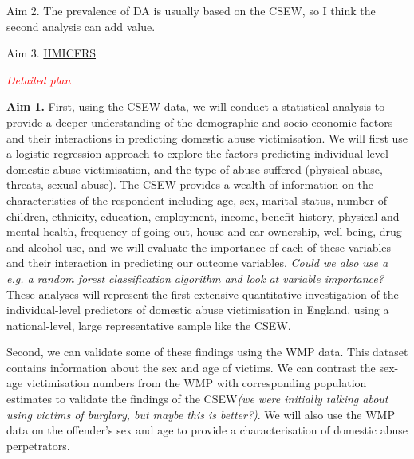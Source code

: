 \documentclass[11pt, a4paper]{article}
\begin{document}
Aim 2. The prevalence of DA is usually based on the CSEW, so I think the second analysis can add value.

Aim 3. \href{https://www.justiceinspectorates.gov.uk/hmicfrs/news/news-feed/little-evidence-of-improvements-in-crime-recording-at-west-midlands-police/}{HMICFRS}

\textcolor{red}{\textit{Detailed plan}}

\textbf{Aim 1.} First, using the CSEW data, we will conduct a statistical analysis to provide a deeper understanding of the demographic and socio-economic factors and their interactions in predicting domestic abuse victimisation. We will first use a logistic regression approach to explore the factors predicting individual-level domestic abuse victimisation, and the type of abuse suffered (physical abuse, threats, sexual abuse). The CSEW provides a wealth of information on the characteristics of the respondent including age, sex, marital status, number of children, ethnicity, education, employment, income, benefit history, physical and mental health, frequency of going out, house and car ownership, well-being, drug and alcohol use, and we will evaluate the importance of each of these variables and their interaction in predicting our outcome variables. \textit{Could we also use a e.g. a random forest classification algorithm and look at variable importance?}  These analyses will represent the first extensive quantitative investigation of the individual-level predictors of domestic abuse victimisation in England, using a national-level, large representative sample like the CSEW. 

Second, we can validate some of these findings using the WMP data. This dataset contains information about the sex and age of victims. We can contrast the sex-age victimisation numbers from the WMP with corresponding population estimates to validate the findings of the CSEW\textit{(we were initially talking about using victims of burglary, but maybe this is better?)}. We will also use the WMP data on the offender's sex and age to provide a characterisation of domestic abuse perpetrators.

\end{document}

